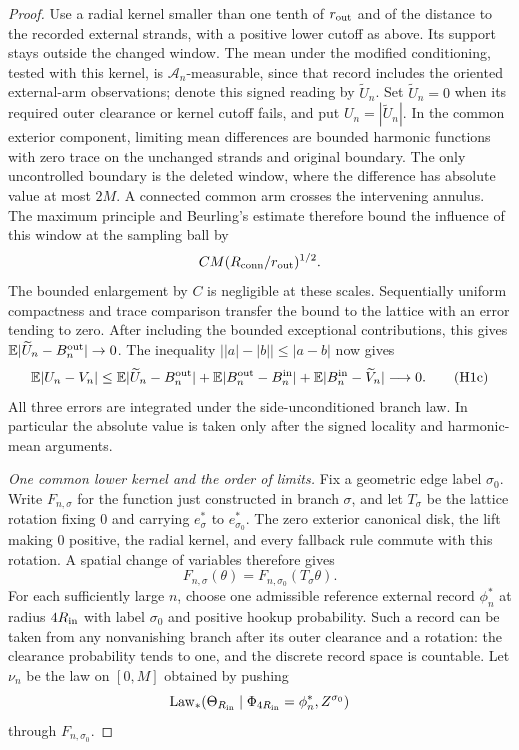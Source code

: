 \begin{proof}
Use a radial kernel smaller than one tenth of $r_{\rm out}$ and
of the distance to the recorded external strands, with a positive
lower cutoff as above. Its support stays outside the changed window.
The mean under the modified conditioning, tested with this kernel,
is $\mathcal A_n$-measurable, since that record includes the oriented
external-arm observations; denote this signed reading by
$\widetilde U_n$. Set $\widetilde U_n=0$ when its required outer
clearance or kernel cutoff fails, and put $U_n=|\widetilde U_n|$.
In the common exterior component, limiting mean differences are bounded
harmonic functions with zero trace on the unchanged strands and original
boundary. The only uncontrolled boundary is the deleted window, where
the difference has absolute value at most $2M$. A connected common arm
crosses the intervening annulus. The maximum principle and Beurling's
estimate therefore bound the influence of this window at the sampling
ball by
\[
 C M(R_{\rm conn}/r_{\rm out})^{1/2}.
\]
The bounded enlargement by $C$ is negligible at these scales.
Sequentially uniform compactness and trace comparison transfer the
bound to the lattice with an error tending to zero. After including
the bounded exceptional contributions, this gives
$\mathbb E|\widetilde U_n-B_n^{\rm out}|\to0$.
The inequality $\bigl||a|-|b|\bigr|\le |a-b|$ now gives
\[
 \mathbb E|U_n-V_n|
 \le \mathbb E|\widetilde U_n-B_n^{\rm out}|
     +\mathbb E|B_n^{\rm out}-B_n^{\rm in}|
     +\mathbb E|B_n^{\rm in}-\widetilde V_n|
 \longrightarrow0.                                      \tag{H1c}
\]
All three errors are integrated under the side-unconditioned branch
law. In particular the absolute value is taken only after the signed
locality and harmonic-mean arguments.

\emph{One common lower kernel and the order of limits.}
Fix a geometric edge label $\sigma_0$. Write $F_{n,\sigma}$ for the
function just constructed in branch $\sigma$, and let $T_\sigma$ be
the lattice rotation fixing $0$ and carrying $e_\sigma^*$ to
$e_{\sigma_0}^*$. The zero exterior canonical disk, the lift making
$0$ positive, the radial kernel, and every fallback rule commute with
this rotation. A spatial change of variables therefore gives
\[
 F_{n,\sigma}(\theta)
       =F_{n,\sigma_0}(T_\sigma\theta).                  \tag{H1d}
\]
For each sufficiently large $n$, choose one admissible reference
external record $\phi_n^*$ at radius $4R_{\rm in}$ with label
$\sigma_0$ and positive hookup probability. Such a record can be
taken from any nonvanishing branch after its outer clearance and a
rotation: the clearance probability tends to one, and the discrete
record space is countable. Let $\nu_n$ be the
law on $[0,M]$ obtained by pushing
\[
 \operatorname{Law}_*(\Theta_{R_{\rm in}}\mid
             \Phi_{4R_{\rm in}}=\phi_n^*,Z^{\sigma_0})
\]
through $F_{n,\sigma_0}$.


\end{proof}
